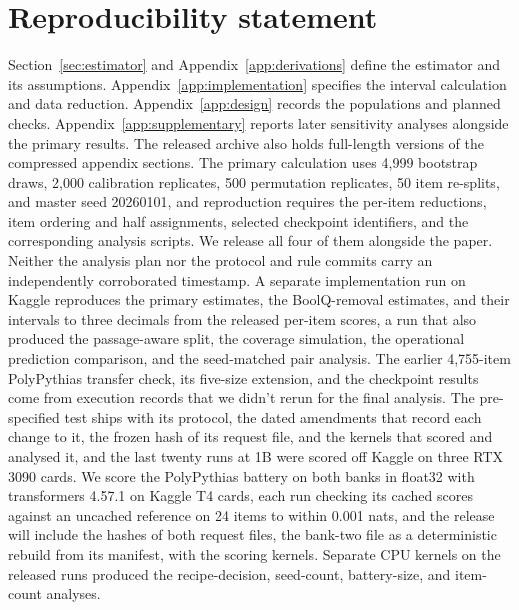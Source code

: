 \section*{Reproducibility statement}
Section~\ref{sec:estimator} and Appendix~\ref{app:derivations} define the estimator and its assumptions. Appendix~\ref{app:implementation} specifies the interval calculation and data reduction. Appendix~\ref{app:design} records the populations and planned checks. Appendix~\ref{app:supplementary} reports later sensitivity analyses alongside the primary results. The released archive also holds full-length versions of the compressed appendix sections. The primary calculation uses 4,999 bootstrap draws, 2,000 calibration replicates, 500 permutation replicates, 50 item re-splits, and master seed 20260101, and reproduction requires the per-item reductions, item ordering and half assignments, selected checkpoint identifiers, and the corresponding analysis scripts. We release all four of them alongside the paper. Neither the analysis plan nor the protocol and rule commits carry an independently corroborated timestamp. A separate implementation run on Kaggle reproduces the primary estimates, the BoolQ-removal estimates, and their intervals to three decimals from the released per-item scores, a run that also produced the passage-aware split, the coverage simulation, the operational prediction comparison, and the seed-matched pair analysis. The earlier 4,755-item PolyPythias transfer check, its five-size extension, and the checkpoint results come from execution records that we didn't rerun for the final analysis. The pre-specified test ships with its protocol, the dated amendments that record each change to it, the frozen hash of its request file, and the kernels that scored and analysed it, and the last twenty runs at 1B were scored off Kaggle on three RTX 3090 cards. We score the PolyPythias battery on both banks in float32 with transformers 4.57.1 on Kaggle T4 cards, each run checking its cached scores against an uncached reference on 24 items to within 0.001 nats, and the release will include the hashes of both request files, the bank-two file as a deterministic rebuild from its manifest, with the scoring kernels. Separate CPU kernels on the released runs produced the recipe-decision, seed-count, battery-size, and item-count analyses.
